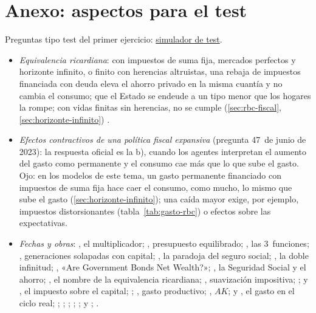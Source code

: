 \documentclass[11pt]{article}
\begin{document}
\section{Anexo: aspectos para el test}\label{anexo:test}

\begin{anotaciones}
Preguntas tipo test del primer ejercicio: \href{https://www.victorgutierrezmarcos.es/oposicion/temario/primer-ejercicio/test/simulador.html?tema=3.A.38}{simulador de test}.
\end{anotaciones}

\begin{itemize}
\item \emph{Equivalencia ricardiana}: con impuestos de suma fija, mercados perfectos y horizonte infinito, o finito con herencias altruistas, una rebaja de impuestos financiada con deuda eleva el ahorro privado en la misma cuantía y no cambia el consumo; que el Estado se endeude a un tipo menor que los hogares la rompe; con vidas finitas sin herencias, no se cumple (\ref{sec:rbc-fiscal}, \ref{sec:horizonte-infinito}) .
\item \emph{Efectos contractivos de una política fiscal expansiva} (pregunta 47~de junio de 2023): la respuesta oficial es la b), cuando los agentes interpretan el aumento del gasto como permanente y el consumo cae más que lo que sube el gasto. Ojo: en los modelos de este tema, un gasto permanente financiado con impuestos de suma fija hace caer el consumo, como mucho, lo mismo que sube el gasto (\ref{sec:horizonte-infinito}); una caída mayor exige, por ejemplo, impuestos distorsionantes (tabla~\ref{tab:gasto-rbc}) o efectos sobre las expectativas.
\item \emph{Fechas y obras}: \textcite{Kahn1931Relation}, el multiplicador; \textcite{Haavelmo1945Multiplier}, presupuesto equilibrado; \textcite{Musgrave1959Theory}, las 3~funciones; \textcite{Diamond1965National}, generaciones solapadas con capital; \textcite{Aaron1966Social}, la paradoja del seguro social; \textcite{Shell1971Notes}, la doble infinitud; \textcite{Barro1974}, «Are Government Bonds Net Wealth?»; \textcite{Feldstein1974Social}, la Seguridad Social y el ahorro; \textcite{Buchanan1976Barro}, el nombre de la equivalencia ricardiana; \textcite{Barro1979Determination}, suavización impositiva; \textcite{LeimerLesnoy1982Social}; \textcite{Judd1985Redistributive} y \textcite{Chamley1986Optimal}, el impuesto sobre el capital; \textcite{Aschauer1989Public}; \textcite{Barro1990}, gasto productivo; \textcite{Rebelo1991Long}, $AK$; \textcite{ChristianoEichenbaum1992Current} y \textcite{BaxterKing1993Fiscal}, el gasto en el ciclo real; \textcite{KnellerBleaneyGemmell1999}; \textcite{BlanchardPerotti2002Empirical}; \textcite{GaliLopezSalidoValles2007}; \textcite{Hall2009By}; \textcite{RomerRomer2010Tax}; \textcite{Woodford2011Simple} y \textcite{ChristianoEichenbaumRebelo2011}; \textcite{StraubWerning2020Positive}.

\end{itemize}
\end{document}
